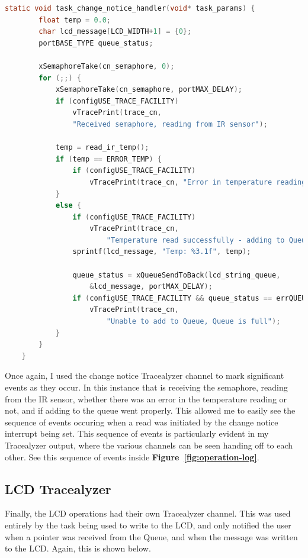 \documentclass[a4paper, 12pt]{article}
\begin{document}
	\begin{mdframed}[backgroundcolor=code-gray, roundcorner=10pt,
								innerleftmargin=5, innertopmargin=5, innerbottommargin=5]	
	\begin{lstlisting}[language=C, caption=Change Notice Handler Task, tabsize=2, label={lst:task-change-notice-handler}]
	static void task_change_notice_handler(void* task_params) {
		float temp = 0.0;
		char lcd_message[LCD_WIDTH+1] = {0};
		portBASE_TYPE queue_status;
	
		xSemaphoreTake(cn_semaphore, 0);
		for (;;) {
			xSemaphoreTake(cn_semaphore, portMAX_DELAY);
			if (configUSE_TRACE_FACILITY)
				vTracePrint(trace_cn,
				"Received semaphore, reading from IR sensor");
		
			temp = read_ir_temp();
			if (temp == ERROR_TEMP) {
				if (configUSE_TRACE_FACILITY)
					vTracePrint(trace_cn, "Error in temperature reading");
			}
			else {
				if (configUSE_TRACE_FACILITY)
					vTracePrint(trace_cn,
						"Temperature read successfully - adding to Queue");
				sprintf(lcd_message, "Temp: %3.1f", temp);
			
				queue_status = xQueueSendToBack(lcd_string_queue,
					&lcd_message, portMAX_DELAY);
				if (configUSE_TRACE_FACILITY && queue_status == errQUEUE_FULL)
					vTracePrint(trace_cn,
						"Unable to add to Queue, Queue is full");
			}
		}
	}
	\end{lstlisting}
	\end{mdframed}
	
Once again, I used the change notice Tracealyzer channel to mark significant events as they occur. In this instance that is receiving the semaphore, reading from the IR sensor, whether there was an error in the temperature reading or not, and if adding to the queue went properly. This allowed me to easily see the sequence of events occuring when a read was initiated by the change notice interrupt being set. This sequence of events is particularly evident in my Tracealyzer output, where the various channels can be seen handing off to each other. See this sequence of events inside \textbf{Figure~\ref{fig:operation-log}}.

\subsection{LCD Tracealyzer}
Finally, the LCD operations had their own Tracealyzer channel. This was used entirely by the task being used to write to the LCD, and only notified the user when a pointer was received from the Queue, and when the message was written to the LCD. Again, this is shown below.
\end{document}
